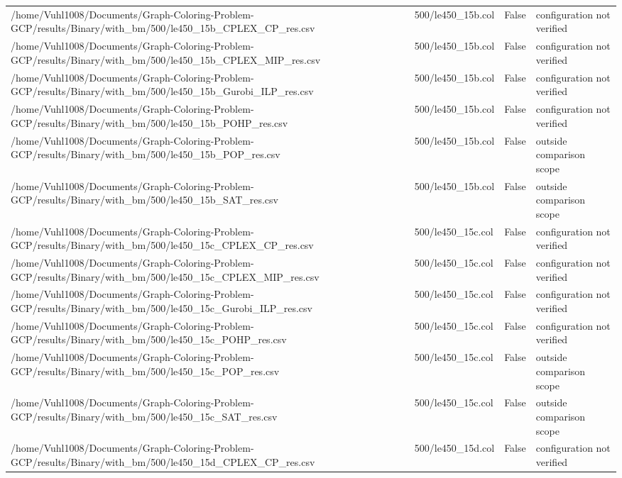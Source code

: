 \begin{table}[htbp]
\begin{tabular}{llll}
/home/Vuhl1008/Documents/Graph-Coloring-Problem-GCP/results/Binary/with\_bm/500/le450\_15b\_CPLEX\_CP\_res.csv & 500/le450\_15b.col & False & configuration not verified \\
/home/Vuhl1008/Documents/Graph-Coloring-Problem-GCP/results/Binary/with\_bm/500/le450\_15b\_CPLEX\_MIP\_res.csv & 500/le450\_15b.col & False & configuration not verified \\
/home/Vuhl1008/Documents/Graph-Coloring-Problem-GCP/results/Binary/with\_bm/500/le450\_15b\_Gurobi\_ILP\_res.csv & 500/le450\_15b.col & False & configuration not verified \\
/home/Vuhl1008/Documents/Graph-Coloring-Problem-GCP/results/Binary/with\_bm/500/le450\_15b\_POHP\_res.csv & 500/le450\_15b.col & False & configuration not verified \\
/home/Vuhl1008/Documents/Graph-Coloring-Problem-GCP/results/Binary/with\_bm/500/le450\_15b\_POP\_res.csv & 500/le450\_15b.col & False & outside comparison scope \\
/home/Vuhl1008/Documents/Graph-Coloring-Problem-GCP/results/Binary/with\_bm/500/le450\_15b\_SAT\_res.csv & 500/le450\_15b.col & False & outside comparison scope \\
/home/Vuhl1008/Documents/Graph-Coloring-Problem-GCP/results/Binary/with\_bm/500/le450\_15c\_CPLEX\_CP\_res.csv & 500/le450\_15c.col & False & configuration not verified \\
/home/Vuhl1008/Documents/Graph-Coloring-Problem-GCP/results/Binary/with\_bm/500/le450\_15c\_CPLEX\_MIP\_res.csv & 500/le450\_15c.col & False & configuration not verified \\
/home/Vuhl1008/Documents/Graph-Coloring-Problem-GCP/results/Binary/with\_bm/500/le450\_15c\_Gurobi\_ILP\_res.csv & 500/le450\_15c.col & False & configuration not verified \\
/home/Vuhl1008/Documents/Graph-Coloring-Problem-GCP/results/Binary/with\_bm/500/le450\_15c\_POHP\_res.csv & 500/le450\_15c.col & False & configuration not verified \\
/home/Vuhl1008/Documents/Graph-Coloring-Problem-GCP/results/Binary/with\_bm/500/le450\_15c\_POP\_res.csv & 500/le450\_15c.col & False & outside comparison scope \\
/home/Vuhl1008/Documents/Graph-Coloring-Problem-GCP/results/Binary/with\_bm/500/le450\_15c\_SAT\_res.csv & 500/le450\_15c.col & False & outside comparison scope \\
/home/Vuhl1008/Documents/Graph-Coloring-Problem-GCP/results/Binary/with\_bm/500/le450\_15d\_CPLEX\_CP\_res.csv & 500/le450\_15d.col & False & configuration not verified \\

\end{tabular}
\end{table}
